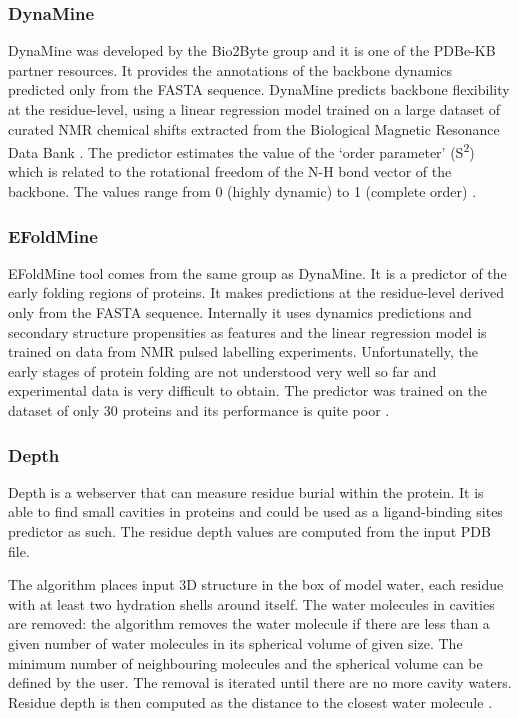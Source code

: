 \subsubsection{DynaMine}
DynaMine was developed by the Bio2Byte group \cite{bio2byte} and it is one of the PDBe-KB partner resources. It provides the annotations of the backbone dynamics predicted only from the FASTA sequence. DynaMine predicts backbone flexibility at the residue-level, using a linear regression model trained on a large dataset of curated NMR chemical shifts extracted from the Biological Magnetic Resonance Data Bank \cite{bmrb}. The predictor estimates the value of the `order parameter' (S\textsuperscript{2}) which is related to the rotational freedom of the N-H bond vector of the backbone. The values range from 0 (highly dynamic) to 1 (complete order) \cite{dynamine}.

\subsubsection{EFoldMine}
EFoldMine tool comes from the same group as DynaMine. It is a predictor of the early folding regions of proteins. It makes predictions at the residue-level derived only from the FASTA sequence. Internally it uses dynamics predictions and secondary structure propensities as features and the linear regression model is trained on data from NMR pulsed labelling experiments. Unfortunatelly, the early stages of protein folding are not understood very well so far and experimental data is very difficult to obtain. The predictor was trained on the dataset of only 30 proteins and its performance is quite poor \cite{efoldmine}.

\subsubsection{Depth}
Depth is a webserver that can measure residue burial within the protein. It is able to find small cavities in proteins and could be used as a ligand-binding sites predictor as such. The residue depth values are computed from the input PDB file.

The algorithm places input 3D structure in the box of model water, each residue with at least two hydration shells around itself. The water molecules in cavities are removed: the algorithm removes the water molecule if there are less than a given number of water molecules in its spherical volume of given size. The minimum number of neighbouring molecules and the spherical volume can be defined by the user. The removal is iterated until there are no more cavity waters. Residue depth is then computed as the distance to the closest water molecule \cite{depth}.


